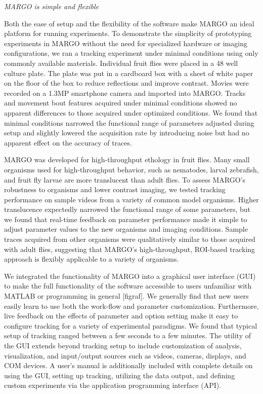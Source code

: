 \documentclass[10pt]{article}
\begin{document}
\begin{multicols}{2}
\textit{MARGO is simple and flexible}

Both the ease of setup and the flexibility of the software make MARGO an ideal platform for running experiments. To demonstrate the simplicity of prototyping experiments in MARGO without the need for specialized hardware or imaging configurations, we ran a tracking experiment under minimal conditions using only commonly available materials.  Individual fruit flies were placed in a 48 well culture plate. The plate was put in a cardboard box with a sheet of white paper on the floor of the box to reduce reflections and improve contrast. Movies were recorded on a 1.3MP smartphone camera and imported into MARGO. Tracks and movement bout features acquired under minimal conditions showed no apparent differences to those acquired under optimized conditions. We found that minimal conditions narrowed the functional range of parameters adjusted during setup and slightly lowered the acquisition rate by introducing noise but had no apparent effect on the accuracy of traces.

MARGO was developed for high-throughput ethology in fruit flies. Many small organisms used for high-throughput behavior, such as nematodes, larval zebrafish, and fruit fly larvae are more translucent than adult flies. To assess MARGO’s robustness to organisms and lower contrast imaging, we tested tracking performance on sample videos from a variety of common model organisms. Higher translucence expectedly narrowed the functional range of some parameters, but we found that real-time feedback on parameter performance made it simple to adjust parameter values to the new organisms and imaging conditions. Sample traces acquired from other organisms were qualitatively similar to those acquired with adult flies, suggesting that MARGO’s high-throughput, ROI-based tracking approach is flexibly applicable to a variety of organisms. 

We integrated the functionality of MARGO into a graphical user interface (GUI) to make the full functionality of the software accessible to users unfamiliar with MATLAB or programming in general [figraf]. We generally find that new users easily learn to use both the work-flow and parameter customization. Furthermore, live feedback on the effects of parameter and option setting make it easy to configure tracking for a variety of experimental paradigms. We found that typical setup of tracking ranged between a few seconds to a few minutes. The utility of the GUI extends beyond tracking setup to include customization of analysis, visualization, and input/output sources such as videos, cameras, displays, and COM devices. A user's manual is additionally included with complete details on using the GUI, setting up tracking, utilizing the data output, and defining custom experiments via the application programming interface (API).


\end{multicols}
\end{document}
